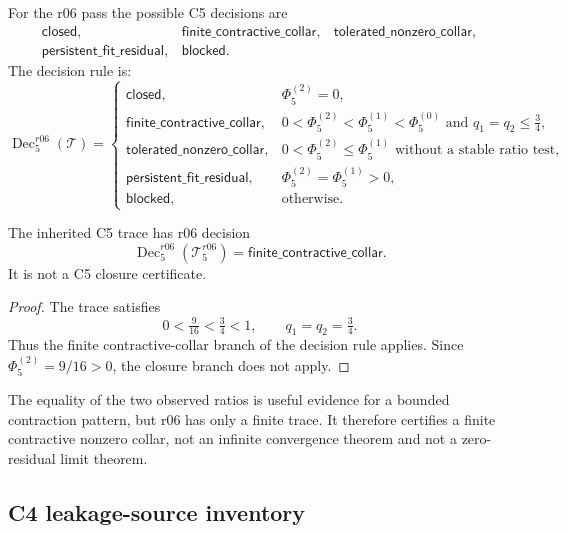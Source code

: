 \begin{definition}
\label{def:v470-r06-c5-decision-alphabet}
For the r06 pass the possible C5 decisions are
\[
\begin{array}{lll}
\mathsf{closed}, & \mathsf{finite\_contractive\_collar},
& \mathsf{tolerated\_nonzero\_collar},\\
\mathsf{persistent\_fit\_residual}, & \mathsf{blocked}. &
\end{array}
\]
The decision rule is:
\[
\operatorname{Dec}_{5}^{r06}(\mathcal T)=
\begin{cases}
\mathsf{closed}, & \Phi_5^{(2)}=0,\\
\mathsf{finite\_contractive\_collar},
&0<\Phi_5^{(2)}<\Phi_5^{(1)}<\Phi_5^{(0)}\text{ and }q_1=q_2\leq\tfrac34,\\
\mathsf{tolerated\_nonzero\_collar},
&0<\Phi_5^{(2)}\leq\Phi_5^{(1)}\text{ without a stable ratio test},\\
\mathsf{persistent\_fit\_residual},&\Phi_5^{(2)}=\Phi_5^{(1)}>0,\\
\mathsf{blocked},&\text{otherwise.}
\end{cases}
\]
\end{definition}

\begin{lemma}
\label{lem:v470-r06-c5-finite-contraction-collar-decision}
The inherited C5 trace has r06 decision
\[
\operatorname{Dec}_{5}^{r06}(\mathcal T_{5}^{r06})
=
\mathsf{finite\_contractive\_collar}.
\]
It is not a C5 closure certificate.
\end{lemma}

\begin{proof}
The trace satisfies
\[
0<\tfrac{9}{16}<\tfrac34<1,
\qquad
q_1=q_2=\tfrac34.
\]
Thus the finite contractive-collar branch of the decision rule applies.  Since
\(\Phi_5^{(2)}=9/16>0\), the closure branch does not apply.
\end{proof}

\begin{remark}
\label{rem:v470-r06-no-infinite-convergence-theorem}
The equality of the two observed ratios is useful evidence for a bounded
contraction pattern, but r06 has only a finite trace.  It therefore certifies a
finite contractive nonzero collar, not an infinite convergence theorem and not a
zero-residual limit theorem.
\end{remark}

\subsection{C4 leakage-source inventory}
\label{subsec:v470-r06-c4-leakage-source-inventory}

